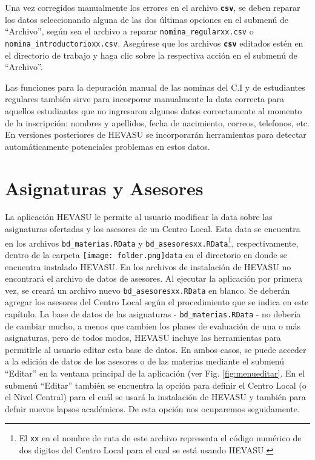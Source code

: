 \documentclass[letterpaper,12pt]{book}
\newcommand{\archivo}[1]
{\texttt{#1}}
\newcommand{\fileformat}[1]{\textbf{\texttt{#1}}}
\newcommand{\carpeta}[1]
{\texttt{[image: folder.png]}\texttt{#1}}
\begin{document}
Una vez corregidos manualmente los errores en el archivo \fileformat{csv}, se deben reparar los datos seleccionando alguna de las dos últimas opciones en el submenú de ``Archivo'', según sea el archivo a reparar \archivo{nomina\_regularxx.csv} o \archivo{nomina\_\-introductorioxx.csv}. Asegúrese que los archivos \fileformat{csv} editados estén en el directorio de trabajo y haga clic sobre la respectiva acción en el submenú de ``Archivo''.

Las funciones para la depuración manual de las nominas del C.I y de estudiantes regulares también sirve para incorporar manualmente la data correcta para aquellos estudiantes que no ingresaron algunos datos correctamente al momento de la inscripción: nombres y apellidos, fecha de nacimiento, correos, telefonos, etc. En versiones posteriores de HEVASU se incorporarán herramientas para detectar automáticamente potenciales problemas en estos datos.   

\chapter{Asignaturas y Asesores}\label{cap:asignaturas_y_asesores}

La aplicación HEVASU le permite al usuario modificar la data sobre las asignaturas ofertadas y los asesores de un Centro Local. Esta data se encuentra en los archivos \archivo{bd\_materias.RData} y \archivo{bd\_asesoresxx.RData}\footnote{El \texttt{xx} en el nombre de ruta de este archivo representa el código numérico de dos digitos del Centro Local para el cual se está usando HEVASU.}, respectivamente, dentro de la carpeta \carpeta{data} en el directorio en donde se encuentra instalado HEVASU.  En los archivos de instalación de HEVASU no encontrará el archivo de datos de asesores. Al ejecutar la aplicación por primera vez, se creará un archivo nuevo \archivo{bd\_asesoresxx.RData} en blanco. Se deberán agregar los asesores del Centro Local según el procedimiento que se indica en este capítulo. La base de datos de las asignaturas - \archivo{bd\_materias.RData} - no debería de cambiar mucho, a menos que cambien los planes de evaluación de una o más asignaturas, pero de todos modos, HEVASU incluye las herramientas para permitirle al usuario editar esta base de datos.  En ambos casos, se puede acceder a la edición de datos de los asesores o de las materias mediante el submenú ``Editar'' en la ventana principal de la aplicación (ver Fig. \ref{fig:menueditar}. En el submenú ``Editar'' también se encuentra la opción para definir el Centro Local (o el Nivel Central) para el cuál se usará la instalación de HEVASU y también para defnir nuevos lapsos académicos. De esta opción nos ocuparemos seguidamente.
\end{document}
